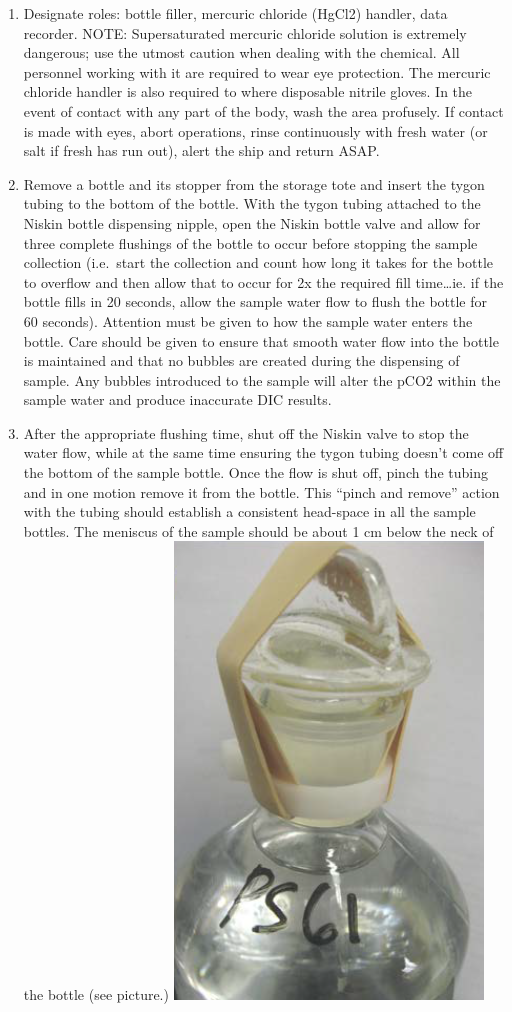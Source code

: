 \documentclass[]{book}
\begin{document}
\begin{enumerate}
\def\labelenumi{\arabic{enumi}.}
\item
  Designate roles: bottle filler, mercuric chloride (HgCl2) handler, data recorder. NOTE: Supersaturated mercuric chloride solution is extremely dangerous; use the utmost caution when dealing with the chemical. All personnel working with it are required to wear eye protection. The mercuric chloride handler is also required to where disposable nitrile gloves. In the event of contact with any part of the body, wash the area profusely. If contact is made with eyes, abort operations, rinse continuously with fresh water (or salt if fresh has run out), alert the ship and return ASAP.
\item
  Remove a bottle and its stopper from the storage tote and insert the tygon tubing to the bottom of the bottle. With the tygon tubing attached to the Niskin bottle dispensing nipple, open the Niskin bottle valve and allow for three complete flushings of the bottle to occur before stopping the sample collection (i.e.~start the collection and count how long it takes for the bottle to overflow and then allow that to occur for 2x the required fill time\ldots ie. if the bottle fills in 20 seconds, allow the sample water flow to flush the bottle for 60 seconds). Attention must be given to how the sample water enters the bottle. Care should be given to ensure that smooth water flow into the bottle is maintained and that no bubbles are created during the dispensing of sample. Any bubbles introduced to the sample will alter the pCO2 within the sample water and produce inaccurate DIC results.
\item
  After the appropriate flushing time, shut off the Niskin valve to stop the water flow, while at the same time ensuring the tygon tubing doesn't come off the bottom of the sample bottle. Once the flow is shut off, pinch the tubing and in one motion remove it from the bottle. This ``pinch and remove'' action with the tubing should establish a consistent head-space in all the sample bottles. The meniscus of the sample should be about 1 cm below the neck of the bottle (see picture.)
  \includegraphics{images/BOD_bottle_headspace.png}

\end{enumerate}
\end{document}
